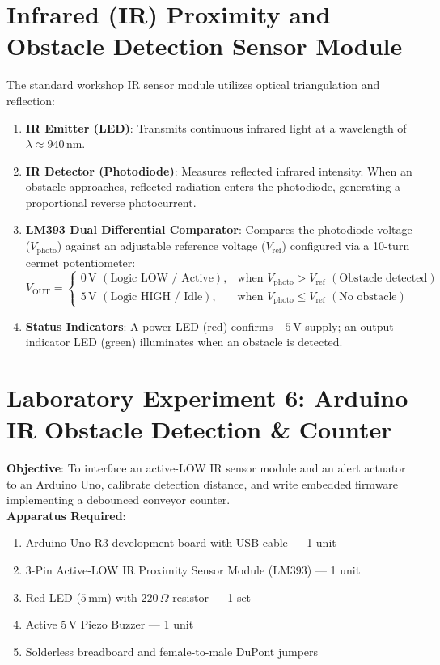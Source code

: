 \section{Infrared (IR) Proximity and Obstacle Detection Sensor Module}
The standard workshop IR sensor module utilizes optical triangulation and reflection:
\begin{enumerate}
    \item \textbf{IR Emitter (LED)}: Transmits continuous infrared light at a wavelength of $\lambda \approx 940\,\mathrm{nm}$.
    \item \textbf{IR Detector (Photodiode)}: Measures reflected infrared intensity. When an obstacle approaches, reflected radiation enters the photodiode, generating a proportional reverse photocurrent.
    \item \textbf{LM393 Dual Differential Comparator}: Compares the photodiode voltage ($V_{\mathrm{photo}}$) against an adjustable reference voltage ($V_{\mathrm{ref}}$) configured via a 10-turn cermet potentiometer:
    \[ V_{\mathrm{OUT}} = \begin{cases} 0\,\mathrm{V}\,\,(\text{Logic LOW / Active}), & \text{when } V_{\mathrm{photo}} > V_{\mathrm{ref}}\,\,(\text{Obstacle detected}) \\ 5\,\mathrm{V}\,\,(\text{Logic HIGH / Idle}), & \text{when } V_{\mathrm{photo}} \le V_{\mathrm{ref}}\,\,(\text{No obstacle}) \end{cases} \]
    \item \textbf{Status Indicators}: A power LED (red) confirms $+5\,\mathrm{V}$ supply; an output indicator LED (green) illuminates when an obstacle is detected.
\end{enumerate}

\section{Laboratory Experiment 6: Arduino IR Obstacle Detection \& Counter}
\begin{experimentbox}
\textbf{Objective}: To interface an active-LOW IR sensor module and an alert actuator to an Arduino Uno, calibrate detection distance, and write embedded firmware implementing a debounced conveyor counter.\\
\textbf{Apparatus Required}:
\begin{enumerate}
    \item Arduino Uno R3 development board with USB cable --- 1 unit
    \item 3-Pin Active-LOW IR Proximity Sensor Module (LM393) --- 1 unit
    \item Red LED ($5\,\mathrm{mm}$) with $220\,\Omega$ resistor --- 1 set
    \item Active $5\,\mathrm{V}$ Piezo Buzzer --- 1 unit
    \item Solderless breadboard and female-to-male DuPont jumpers
\end{enumerate}
\end{experimentbox}

